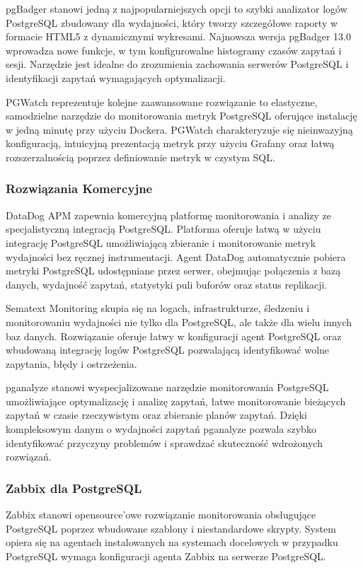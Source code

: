 \documentclass[letterpaper,10pt,polish]{sphinxmanual}
\begin{document}
\sphinxAtStartPar
pgBadger stanowi jedną z najpopularniejszych opcji \sphinxhyphen{} to szybki analizator logów PostgreSQL zbudowany dla wydajności, który tworzy szczegółowe raporty w formacie HTML5 z dynamicznymi wykresami. Najnowsza wersja pgBadger 13.0 wprowadza nowe funkcje, w tym konfigurowalne histogramy czasów zapytań i sesji. Narzędzie jest idealne do zrozumienia zachowania serwerów PostgreSQL i identyfikacji zapytań wymagających optymalizacji.

\sphinxAtStartPar
PGWatch reprezentuje kolejne zaawansowane rozwiązanie \sphinxhyphen{} to elastyczne, samodzielne narzędzie do monitorowania metryk PostgreSQL oferujące instalację w jedną minutę przy użyciu Dockera. PGWatch charakteryzuje się nieinwazyjną konfiguracją, intuicyjną prezentacją metryk przy użyciu Grafany oraz łatwą rozszerzalnością poprzez definiowanie metryk w czystym SQL.


\subsubsection{Rozwiązania Komercyjne}
\label{\detokenize{rozdzial2/repo-wspolne/index:rozwiazania-komercyjne}}
\sphinxAtStartPar
DataDog APM zapewnia komercyjną platformę monitorowania i analizy ze specjalistyczną integracją PostgreSQL. Platforma oferuje łatwą w użyciu integrację PostgreSQL umożliwiającą zbieranie i monitorowanie metryk wydajności bez ręcznej instrumentacji. Agent DataDog automatycznie pobiera metryki PostgreSQL udostępniane przez serwer, obejmując połączenia z bazą danych, wydajność zapytań, statystyki puli buforów oraz status replikacji.

\sphinxAtStartPar
Sematext Monitoring skupia się na logach, infrastrukturze, śledzeniu i monitorowaniu wydajności nie tylko dla PostgreSQL, ale także dla wielu innych baz danych. Rozwiązanie oferuje łatwy w konfiguracji agent PostgreSQL oraz wbudowaną integrację logów PostgreSQL pozwalającą identyfikować wolne zapytania, błędy i ostrzeżenia.

\sphinxAtStartPar
pganalyze stanowi wyspecjalizowane narzędzie monitorowania PostgreSQL umożliwiające optymalizację i analizę zapytań, łatwe monitorowanie bieżących zapytań w czasie rzeczywistym oraz zbieranie planów zapytań. Dzięki kompleksowym danym o wydajności zapytań pganalyze pozwala szybko identyfikować przyczyny problemów i sprawdzać skuteczność wdrożonych rozwiązań.


\subsubsection{Zabbix dla PostgreSQL}
\label{\detokenize{rozdzial2/repo-wspolne/index:zabbix-dla-postgresql}}
\sphinxAtStartPar
Zabbix stanowi open\sphinxhyphen{}source’owe rozwiązanie monitorowania obsługujące PostgreSQL poprzez wbudowane szablony i niestandardowe skrypty. System opiera się na agentach instalowanych na systemach docelowych \sphinxhyphen{} w przypadku PostgreSQL wymaga konfiguracji agenta Zabbix na serwerze PostgreSQL.
\end{document}
